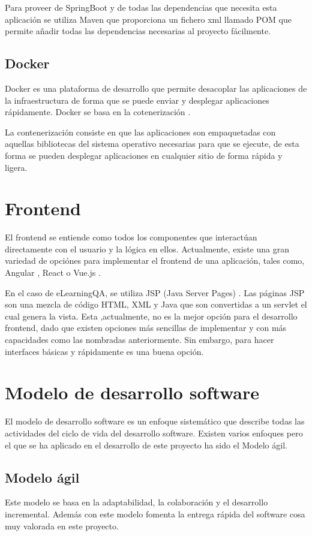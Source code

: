 Para proveer de SpringBoot y de todas las dependencias que necesita esta aplicación se utiliza Maven que proporciona un fichero xml llamado POM que permite añadir todas las dependencias necesarias al proyecto fácilmente.

\subsection{Docker}
Docker \cite{docker} es una plataforma de desarrollo que permite desacoplar las aplicaciones de la infraestructura de forma que se puede enviar y desplegar aplicaciones rápidamente. Docker se basa en la cotenerización \cite{contenerización}. 

La contenerización consiste en que las aplicaciones son empaquetadas con aquellas bibliotecas del sistema operativo necesarias para que se ejecute, de esta forma se pueden desplegar aplicaciones en cualquier sitio de forma rápida y ligera.

\section{Frontend}
El frontend se entiende como todos los componentes que interactúan directamente con el usuario y la lógica en ellos. Actualmente, existe una gran variedad de opciónes para implementar el frontend de una aplicación, tales como, Angular \cite{angular}, React \cite{react} o Vue.js \cite{vue}.

En el caso de eLearningQA, se utiliza JSP (Java Server Pages) \cite{jsp}. Las páginas JSP son una mezcla de código HTML, XML y Java que son convertidas a un servlet el cual genera la vista. Esta ,actualmente, no es la mejor opción para el desarrollo frontend, dado que existen opciones más sencillas de implementar y con más capacidades como las nombradas anteriormente. Sin embargo, para hacer interfaces básicas y rápidamente es una buena opción.

\section{Modelo de desarrollo software}
El modelo de desarrollo software es un enfoque sistemático que describe todas las actividades del ciclo de vida del desarrollo software. Existen varios enfoques \cite{modelo-desarrollo} pero el que se ha aplicado en el desarrollo de este proyecto ha sido el Modelo ágil.

\subsection{Modelo ágil}
Este modelo se basa en la adaptabilidad, la colaboración y el desarrollo incremental. Además con este modelo fomenta la entrega rápida del software cosa muy valorada en este proyecto.

